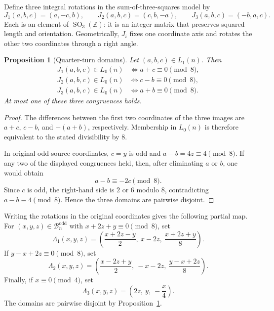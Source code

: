\documentclass[11pt]{amsart}
\newtheorem{proposition}[theorem]{Proposition}
\theoremstyle{definition}
\theoremstyle{remark}
\newcommand{\Z}{\mathbb Z}
\newcommand{\Bodd}{\mathcal B_n^{\mathrm{odd}}}
\begin{document}
Define three integral rotations in the sum-of-three-squares model by
\[
 J_1(a,b,c)=(a,-c,b),
 \qquad
 J_2(a,b,c)=(c,b,-a),
 \qquad
 J_3(a,b,c)=(-b,a,c).
\]
Each is an element of $\operatorname{SO}_3(\Z)$: it is an integer matrix that
preserves squared length and orientation.  Geometrically, $J_i$ fixes one
coordinate axis and rotates the other two coordinates through a right angle.

\begin{proposition}[Quarter-turn domains]\label{prop:quarter-turn-domains}
Let $(a,b,c)\in L_1(n)$.  Then
\begin{align*}
 J_1(a,b,c)\in L_0(n)&\iff a+c\equiv0\pmod8,\\
 J_2(a,b,c)\in L_0(n)&\iff c-b\equiv0\pmod8,\\
 J_3(a,b,c)\in L_0(n)&\iff a+b\equiv0\pmod8.
\end{align*}
At most one of these three congruences holds.
\end{proposition}

\begin{proof}
The differences between the first two coordinates of the three images are
$a+c$, $c-b$, and $-(a+b)$, respectively.  Membership in $L_0(n)$ is
therefore equivalent to the stated divisibility by $8$.

In original odd-source coordinates, $c=y$ is odd and
$a-b=4z\equiv4\pmod8$.  If any two of the displayed congruences held, then,
after eliminating $a$ or $b$, one would obtain
\[
 a-b\equiv -2c\pmod8.
\]
Since $c$ is odd, the right-hand side is $2$ or $6$ modulo $8$, contradicting
$a-b\equiv4\pmod8$.  Hence the three domains are pairwise disjoint.
\end{proof}

Writing the rotations in the original coordinates gives the
following partial map.  For $(x,y,z)\in\Bodd$ with
$x+2z+y\equiv0\pmod8$, set
\begin{equation}\label{eq:Lambda1}
 \Lambda_1(x,y,z)=
 \left(\frac{x+2z-y}{2},\ x-2z,\ \frac{x+2z+y}{8}\right).
\end{equation}
If $y-x+2z\equiv0\pmod8$, set
\begin{equation}\label{eq:Lambda2}
 \Lambda_2(x,y,z)=
 \left(\frac{x-2z+y}{2},\ -x-2z,\ \frac{y-x+2z}{8}\right).
\end{equation}
Finally, if $x\equiv0\pmod4$, set
\begin{equation}\label{eq:Lambda3}
 \Lambda_3(x,y,z)=\left(2z,\ y,\ -\frac{x}{4}\right).
\end{equation}
The domains are pairwise disjoint by Proposition~\ref{prop:quarter-turn-domains}.
\end{document}
